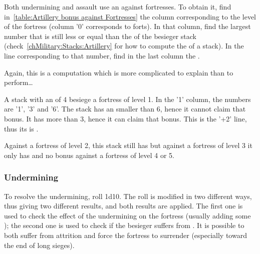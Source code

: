 
\smallskip

Both undermining and assault use an  against
fortresses. To obtain it, find in~\ref{table:Artillery bonus against
  Fortresses} the column corresponding to the level of the fortress (column
'0' corresponds to forts). In that column, find the largest number that is
still less or equal than the  of the besieger stack
(check~\ref{chMilitary:Stacks:Artillery} for how to compute the
 of a stack). In the line corresponding to that number,
find in the last column the .


\begin{exemple}
  Again, this is a computation which is more complicated to explain than to
  perform\ldots

  A stack with an  of 4 besiege a fortress of level
  1. In the '1' column, the numbers are '1', '3' and '6'. The stack has an
   smaller than 6, hence it cannot claim that bonus. It
  has more than 3, hence it can claim that bonus. This is the '+2' line, thus
  its  is .

  Against a fortress of level 2, this stack still has  but against a
  fortress of level 3 it only has  and no bonus against a fortress
  of level 4 or 5.
\end{exemple}

\subsubsection{Undermining}
To resolve the undermining, roll 1d10. The roll is modified in two different
ways, thus giving two different results, and both results are applied. The
first one is used to check the effect of the undermining on the fortress
(usually adding some \USURE); the second one is used to check if the besieger
suffers from . It is possible to both suffer from
attrition and force the fortress to surrender (especially toward the end of
long sieges).

